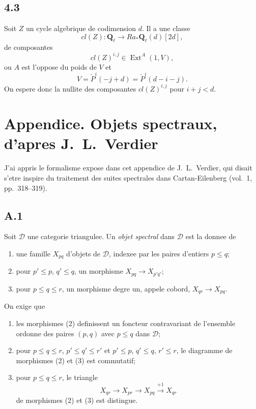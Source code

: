 \documentclass[11pt,a4paper]{article}
\theoremstyle{plain}
\theoremstyle{definition}
\DeclareMathOperator{\Ext}{Ext}
\newcommand{\cD}{\mathscr{D}}
\newcommand{\bQ}{\mathbf{Q}}
\begin{document}
\subsection*{4.3}
Soit $Z$ un cycle algebrique de codimension $d$. Il a une classe
\[
cl(Z) \colon \bQ_\ell \to Ra_* \bQ_\ell(d)[2d],
\]
de composantes
\[
cl(Z)^{i,j} \in \Ext^A(1, V),
\]
ou $A$ est l'oppose du poids de $V$ et
\[
V = \check{P}^i(-j+d) = \check{P}^i(d-i-j).
\]
On espere donc la nullite des composantes $cl(Z)^{i,j}$ pour $i+j < d$.

\appendix
\section*{Appendice. Objets spectraux, d'apres J.~L.~Verdier}

J'ai appris le formalisme expose dans cet appendice de J.~L.~Verdier, qui disait s'etre inspire du traitement des suites spectrales dans Cartan-Eilenberg (vol.~1, pp.~318--319).

\subsection*{A.1}
Soit $\cD$ une categorie triangulee. Un \emph{objet spectral} dans $\cD$ est la donnee de
\begin{enumerate}[label=(\arabic*)]
\item une famille $X_{pq}$ d'objets de $\cD$, indexee par les paires d'entiers $p \leqslant q$;
\item pour $p' \leqslant p$, $q' \leqslant q$, un morphisme $X_{pq} \to X_{p'q'}$;
\item pour $p \leqslant q \leqslant r$, un morphisme degre un, appele cobord, $X_{qr} \to X_{pq}$.
\end{enumerate}
On exige que
\begin{enumerate}[label=(\alph*)]
\item les morphismes (2) definissent un foncteur contravariant de l'ensemble ordonne des paires $(p,q)$ avec $p \leqslant q$ dans $\cD$;
\item pour $p \leqslant q \leqslant r$, $p' \leqslant q' \leqslant r'$ et $p' \leqslant p$, $q' \leqslant q$, $r' \leqslant r$, le diagramme de morphismes (2) et (3) est commutatif;
\item pour $p \leqslant q \leqslant r$, le triangle
\[
X_{qr} \to X_{pr} \to X_{pq} \xrightarrow{+1} X_{qr}
\]
de morphismes (2) et (3) est distingue.
\end{enumerate}
\end{document}
